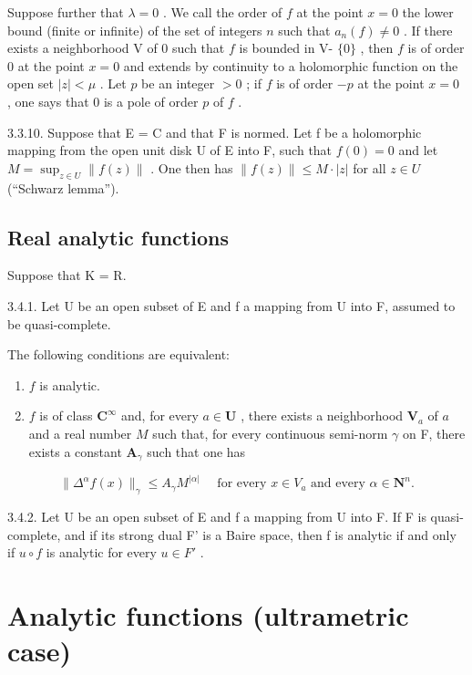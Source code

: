 Suppose further that \(\lambda=0\) . We call the order of \(f\) at the point \(x=0\) the lower bound (finite or infinite) of the set of integers \(n\) such that \(a_{n}(f)\neq0\) . If there exists a neighborhood V of 0 such that \(f\) is bounded in V- \(\{0\}\) , then \(f\) is of order 0 at the point \(x=0\) and extends by continuity to a holomorphic function on the open set \(|z|<\mu\) . Let \(p\) be an integer \(>0\) ; if \(f\) is of order \(-p\) at the point \(x=0\) , one says that 0 is a pole of order \(p\) of \(f\) .

3.3.10. Suppose that E = C and that F is normed. Let f be a holomorphic mapping from the open unit disk U of E into F, such that \(f(0) = 0\) and let \(M = \sup_{z \in U} \|f(z)\|\) . One then has \(\|f(z)\| \leqslant M \cdot |z|\) for all \(z \in U\) (“Schwarz lemma”).

\subsection{Real analytic functions}

Suppose that K = R.

3.4.1. Let U be an open subset of E and f a mapping from U into F, assumed to be quasi-complete.

The following conditions are equivalent:

\begin{enumerate}
\def\labelenumi{(\roman{enumi})}
\item
  \(f\) is analytic.
\item
  \(f\) is of class \(\mathbf{C}^{\infty}\) and, for every \(a\in\mathbf{U} \) , there exists a neighborhood \(\mathbf{V}_{a}\) of \(a\) and a real number \(M\) such that, for every continuous semi-norm \(\gamma\) on F, there exists a constant \(\mathbf{A}_{\gamma}\) such that one has
\end{enumerate}

\[
\| \Delta^ {\alpha} f (x) \| _ {\gamma} \leqslant A _ {\gamma} M ^ {| \alpha |} \quad \text {   for   every   } x \in V _ {a} \text {   and   every   } \alpha \in \mathbf {N} ^ {n}.
\]

3.4.2. Let U be an open subset of E and f a mapping from U into F. If F is quasi-complete, and if its strong dual F' is a Baire space, then f is analytic if and only if \(u \circ f\) is analytic for every \(u \in F'\) .

\section{Analytic functions (ultrametric case)}

